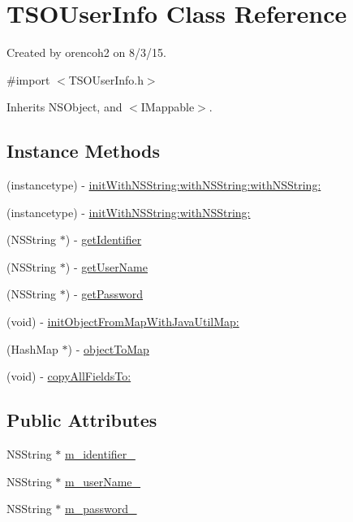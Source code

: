 \hypertarget{interface_t_s_o_user_info}{}\section{T\+S\+O\+User\+Info Class Reference}
\label{interface_t_s_o_user_info}


Created by orencoh2 on 8/3/15.  




{\ttfamily \#import $<$T\+S\+O\+User\+Info.\+h$>$}



Inherits N\+S\+Object, and $<$\+I\+Mappable$>$.

\subsection*{Instance Methods}
\begin{DoxyCompactItemize}
\item 
(instancetype) -\/ \hyperlink{interface_t_s_o_user_info_a4cc25574dfc76a40e515c9fe97b16c30}{init\+With\+N\+S\+String\+:with\+N\+S\+String\+:with\+N\+S\+String\+:}
\item 
(instancetype) -\/ \hyperlink{interface_t_s_o_user_info_a45a332c565a58af8413362e81fd61c67}{init\+With\+N\+S\+String\+:with\+N\+S\+String\+:}
\item 
(N\+S\+String $\ast$) -\/ \hyperlink{interface_t_s_o_user_info_abfb86c1c1e65773bd57a92c4698e0b72}{get\+Identifier}
\item 
(N\+S\+String $\ast$) -\/ \hyperlink{interface_t_s_o_user_info_ade0ed3c038f8d25518f7a153b69caefd}{get\+User\+Name}
\item 
(N\+S\+String $\ast$) -\/ \hyperlink{interface_t_s_o_user_info_ad1a7033cc8d9272a30025d691382b57b}{get\+Password}
\item 
(void) -\/ \hyperlink{interface_t_s_o_user_info_afe384c94c93cbc98fdddc4bc2e237ce2}{init\+Object\+From\+Map\+With\+Java\+Util\+Map\+:}
\item 
(Hash\+Map $\ast$) -\/ \hyperlink{interface_t_s_o_user_info_a03fbbcc8008a6f84a0609a82ec0d2447}{object\+To\+Map}
\item 
(void) -\/ \hyperlink{interface_t_s_o_user_info_a032eb96cd3c0b8a37a3185bbd9e454f1}{copy\+All\+Fields\+To\+:}
\end{DoxyCompactItemize}
\subsection*{Public Attributes}
\begin{DoxyCompactItemize}
\item 
N\+S\+String $\ast$ \hyperlink{interface_t_s_o_user_info_a5b1eb6eed0b668139e124dfac2d47007}{m\+\_\+identifier\+\_\+}
\item 
N\+S\+String $\ast$ \hyperlink{interface_t_s_o_user_info_afe8cb62c29a17cbe4fa813c42a09d161}{m\+\_\+user\+Name\+\_\+}
\item 
N\+S\+String $\ast$ \hyperlink{interface_t_s_o_user_info_ab83e5fcd66f881b28e2b846291517ad2}{m\+\_\+password\+\_\+}
\end{DoxyCompactItemize}


